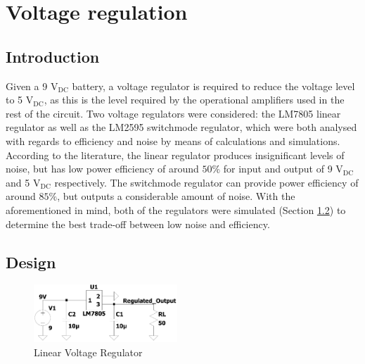 \chapter{Voltage regulation}\label{ch:voltageRegulation}

\section{Introduction} \label{sec:voltIntro}

Given a 9 $\mathrm{V_{DC}}$ battery, a voltage regulator is required to reduce the voltage level to 5 $\mathrm{V_{DC}}$, as this is the level required by the operational amplifiers used in the rest of the circuit. Two voltage regulators were considered: the LM7805 linear regulator as well as the LM2595 switchmode regulator, which were both analysed with regards to efficiency and noise by means of calculations and simulations. According to the literature, the linear regulator produces insignificant levels of noise, but has low power efficiency of around $50\%$ for input and output of 9 $\mathrm{V_{DC}}$ and 5 $\mathrm{V_{DC}}$\cite{lm7805} respectively. The switchmode regulator can provide power efficiency of around $85\%$, but outputs a considerable amount of noise\cite{lm2595}. With the aforementioned in mind, both of the regulators were simulated (Section \ref{sec:voltDesign}) to determine the best trade-off between low noise and efficiency.

\section{Design} \label{sec:voltDesign}

\begin{figure}
	\vspace{-1.3cm}
    \centering
    \includegraphics[width = 0.48\textwidth]{Figures/LR.pdf}
    \caption{Linear Voltage Regulator}
    \label{fig:LR}
\end{figure}

